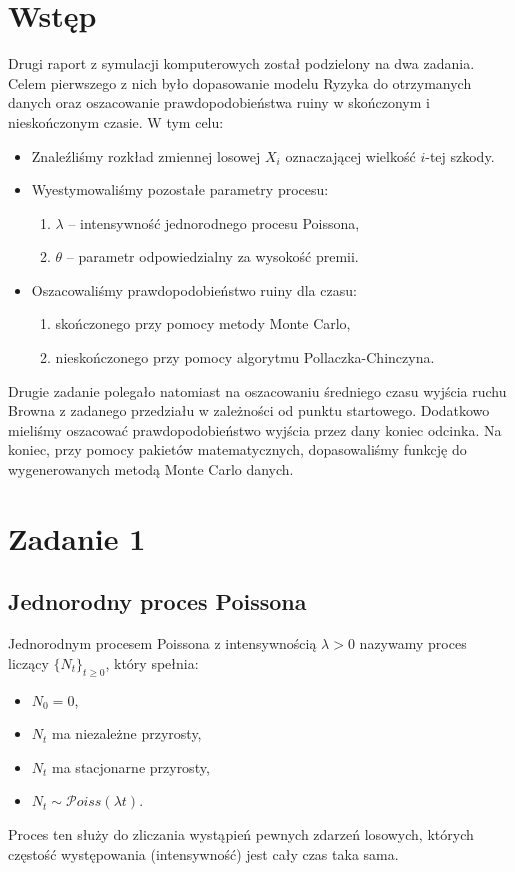 \documentclass[12pt]{mwart}
\begin{document}
	\section{Wstęp}
	\noindent Drugi raport z symulacji komputerowych został podzielony na dwa zadania. Celem pierwszego z nich było dopasowanie modelu Ryzyka do otrzymanych danych oraz oszacowanie prawdopodobieństwa ruiny w skończonym i nieskończonym czasie. W tym celu:
	\begin{itemize}[leftmargin=10mm, label=\small$\bullet$]
		\item Znaleźliśmy rozkład zmiennej losowej $X_i$ oznaczającej wielkość $i$-tej szkody.
		\item Wyestymowaliśmy pozostałe parametry procesu:
		\begin{enumerate}[leftmargin=10mm]
			\item $\lambda$ -- intensywność jednorodnego procesu Poissona,
			\item $\theta$ -- parametr odpowiedzialny za wysokość premii.
		\end{enumerate}
		\item Oszacowaliśmy prawdopodobieństwo ruiny dla czasu:
		\begin{enumerate}[leftmargin=10mm]
			\item skończonego przy pomocy metody Monte Carlo,
			\item nieskończonego przy pomocy algorytmu Pollaczka-Chinczyna.
		\end{enumerate}
	\end{itemize}
	\noindent Drugie zadanie polegało natomiast na oszacowaniu średniego czasu wyjścia ruchu Browna z zadanego przedziału w zależności od punktu startowego. Dodatkowo mieliśmy oszacować prawdopodobieństwo wyjścia przez dany koniec odcinka. Na koniec, przy pomocy pakietów matematycznych, dopasowaliśmy funkcję do wygenerowanych metodą Monte Carlo danych.
	
	
	
	\section{Zadanie 1}

	\subsection{Jednorodny proces Poissona}
	
	\noindent Jednorodnym procesem Poissona z intensywnością $\lambda > 0$ nazywamy proces liczący $\{N_t\}_{t \geq 0}$, który spełnia:
	\begin{itemize}[leftmargin=10mm, label={\small$\bullet$}]
		\item $N_0 = 0$,
		\item $N_t$ ma niezależne przyrosty,
		\item $N_t$ ma stacjonarne przyrosty,
		\item $N_t \sim \mathcal{P}oiss(\lambda t)$.
	\end{itemize}
	Proces ten służy do zliczania wystąpień pewnych zdarzeń losowych, których częstość występowania (intensywność) jest cały czas taka sama.\\
	
\end{document}
